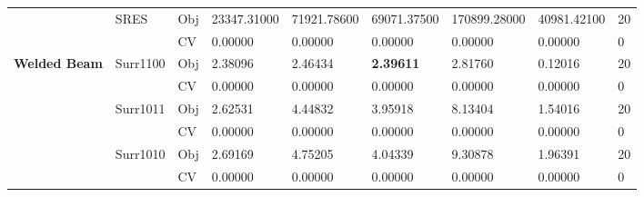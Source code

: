 \begin{table*}[!htb]
\begin{tabular}{lllllllll}
		& SRES                               & Obj                                & 23347.31000                        & 71921.78600                        & 69071.37500                          & 170899.28000                        & 40981.42100                       & 20               \\
		&                                    & CV                                 & 0.00000                            & 0.00000                            & 0.00000                              & 0.00000                             & 0.00000                           & 0                \\ \hline
		\multirow{16}{*}{\textbf{Welded Beam}}       & Surr1100                           & Obj                                & 2.38096                            & 2.46434                            & \textbf{2.39611}                     & 2.81760                             & 0.12016                           & 20               \\
		&                                    & CV                                 & 0.00000                            & 0.00000                            & 0.00000                              & 0.00000                             & 0.00000                           & 0                \\
		& Surr1011                           & Obj                                & 2.62531                            & 4.44832                            & 3.95918                              & 8.13404                             & 1.54016                           & 20               \\
		&                                    & CV                                 & 0.00000                            & 0.00000                            & 0.00000                              & 0.00000                             & 0.00000                           & 0                \\
		& Surr1010                           & Obj                                & 2.69169                            & 4.75205                            & 4.04339                              & 9.30878                             & 1.96391                           & 20               \\
		&                                    & CV                                 & 0.00000                            & 0.00000                            & 0.00000                              & 0.00000                             & 0.00000                           & 0                \\

\end{tabular}
\end{table*}
